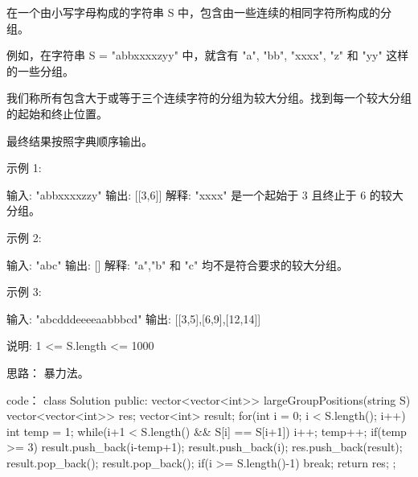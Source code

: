 在一个由小写字母构成的字符串 S 中，包含由一些连续的相同字符所构成的分组。

例如，在字符串 S = "abbxxxxzyy" 中，就含有 "a", "bb", "xxxx", "z" 和 "yy" 这样的一些分组。

我们称所有包含大于或等于三个连续字符的分组为较大分组。找到每一个较大分组的起始和终止位置。

最终结果按照字典顺序输出。

示例 1:

输入: "abbxxxxzzy"
输出: [[3,6]]
解释: "xxxx" 是一个起始于 3 且终止于 6 的较大分组。

示例 2:

输入: "abc"
输出: []
解释: "a","b" 和 "c" 均不是符合要求的较大分组。

示例 3:

输入: "abcdddeeeeaabbbcd"
输出: [[3,5],[6,9],[12,14]]

说明:  1 <= S.length <= 1000

























思路：
暴力法。






















code：
class Solution {
public:
    vector<vector<int>> largeGroupPositions(string S) {
        vector<vector<int>> res;
        vector<int> result;
        for(int i = 0; i < S.length(); i++)
        {
            int temp = 1;
            while(i+1 < S.length() && S[i] == S[i+1])
            {
                i++;
                temp++;
            }
            if(temp >= 3)
            {
                result.push_back(i-temp+1);
                result.push_back(i);
                res.push_back(result);
                result.pop_back();
                result.pop_back();
            }
            if(i >= S.length()-1) break;
        }
        return res;
    }
};